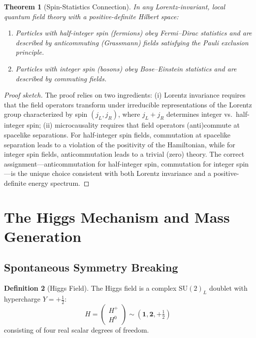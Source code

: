 \documentclass[12pt]{article}
\newtheorem{theorem}{Theorem}[section]
\theoremstyle{definition}
\newtheorem{definition}[theorem]{Definition}
\theoremstyle{remark}
\begin{document}
\begin{theorem}[Spin-Statistics Connection]
\label{thm:spinstatistics}
In any Lorentz-invariant, local quantum field theory with a positive-definite Hilbert space:
\begin{enumerate}
    \item Particles with half-integer spin (fermions) obey Fermi--Dirac statistics and are described by anticommuting (Grassmann) fields satisfying the Pauli exclusion principle.
    \item Particles with integer spin (bosons) obey Bose--Einstein statistics and are described by commuting fields.
\end{enumerate}
\end{theorem}

\begin{proof}[Proof sketch]
The proof relies on two ingredients: (i) Lorentz invariance requires that the field operators transform under irreducible representations of the Lorentz group characterized by spin $(j_L, j_R)$, where $j_L + j_R$ determines integer vs.\ half-integer spin; (ii) microcausality requires that field operators (anti)commute at spacelike separations. For half-integer spin fields, commutation at spacelike separation leads to a violation of the positivity of the Hamiltonian, while for integer spin fields, anticommutation leads to a trivial (zero) theory. The correct assignment---anticommutation for half-integer spin, commutation for integer spin---is the unique choice consistent with both Lorentz invariance and a positive-definite energy spectrum.
\end{proof}

\section{The Higgs Mechanism and Mass Generation}
\label{sec:higgs}

\subsection{Spontaneous Symmetry Breaking}

\begin{definition}[Higgs Field]
\label{def:higgsfield}
The Higgs field is a complex $\mathrm{SU}(2)_L$ doublet with hypercharge $Y = +\frac{1}{2}$:
\begin{equation}
H = \begin{pmatrix} H^+ \\ H^0 \end{pmatrix} \sim (\mathbf{1}, \mathbf{2}, +\tfrac{1}{2})
\end{equation}
consisting of four real scalar degrees of freedom.
\end{definition}
\end{document}
